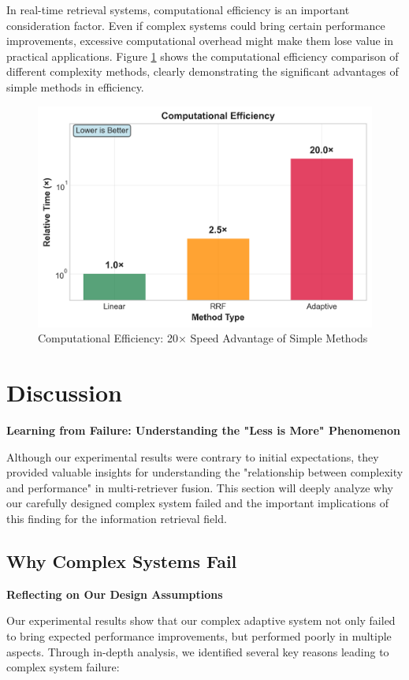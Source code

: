 \documentclass[letterpaper]{article} %
\begin{document}
In real-time retrieval systems, computational efficiency is an important consideration factor. Even if complex systems could bring certain performance improvements, excessive computational overhead might make them lose value in practical applications. Figure \ref{fig:efficiency} shows the computational efficiency comparison of different complexity methods, clearly demonstrating the significant advantages of simple methods in efficiency.

\begin{figure}[t]
\centering
\includegraphics[width=0.8\columnwidth]{charts/computational_efficiency.png}
\caption{Computational Efficiency: 20× Speed Advantage of Simple Methods}
\label{fig:efficiency}
\end{figure}

\section{Discussion}

\textbf{Learning from Failure: Understanding the "Less is More" Phenomenon}

Although our experimental results were contrary to initial expectations, they provided valuable insights for understanding the "relationship between complexity and performance" in multi-retriever fusion. This section will deeply analyze why our carefully designed complex system failed and the important implications of this finding for the information retrieval field.

\subsection{Why Complex Systems Fail}

\textbf{Reflecting on Our Design Assumptions}

Our experimental results show that our complex adaptive system not only failed to bring expected performance improvements, but performed poorly in multiple aspects. Through in-depth analysis, we identified several key reasons leading to complex system failure:
\end{document}
